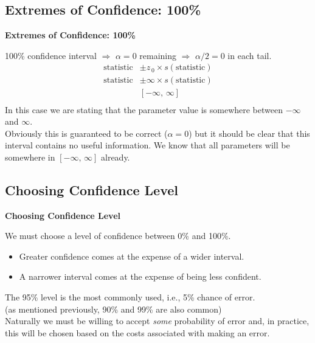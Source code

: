 \documentclass[compress]{beamer}        %
\makeatletter
\newcommand{\tcb}{\textcolor{beamer@blendedblue}}
\makeatother
\begin{document}
\subsection{Extremes of Confidence: 100\%}
\begin{frame}{\bf \tcb{Extremes of Confidence: 100\%}}

100\% confidence interval $\Rightarrow$ $\alpha=0$ remaining $\Rightarrow$ $\alpha/2 = 0$ in each tail.\\[-0.2cm]
\begin{align*}
\text{statistic} &\pm z_{\,0}\times s(\text{statistic})\\
\text{statistic} &\pm \infty\times s(\text{statistic}) \\
&[-\infty,\,\infty]\\
\end{align*}
In this case we are stating that the parameter value is somewhere between $-\infty$ and $\infty$.\\[0.6cm]

Obviously this is guaranteed to be correct ($\alpha=0$) but it should be clear that this interval contains no useful information. We know that all parameters will be somewhere in $[-\infty,\,\infty]$ already.

\end{frame}





\subsection{Choosing Confidence Level}
\begin{frame}{\bf \tcb{Choosing Confidence Level}}

We must choose a level of confidence between 0\% and 100\%.\\[0.1cm]
\begin{itemize}\itemsep0.4cm
\item Greater confidence comes at the expense of a wider interval.
\item A narrower interval comes at the expense of being less confident.\\[0.8cm]
\end{itemize}

The 95\% level is the most commonly used, i.e., 5\% chance of error. \\[0.1cm]
{\footnotesize(as mentioned previously, 90\% and 99\% are also common)}\\[0.8cm]

Naturally we must be willing to accept \emph{some} probability of error and, in practice, this will be chosen based on the costs associated with making an error.

\end{frame}
\end{document}
